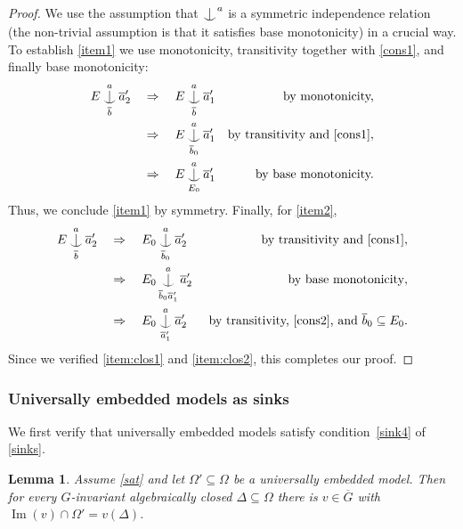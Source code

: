 \documentclass{article}
\newtheorem{lemma}[theorem]{Lemma}
\theoremstyle{remark}
\theoremstyle{definition}
\DeclareMathOperator{\im}{Im}
\def\Ind#1#2{#1\setbox0=\hbox{$#1x$}\kern\wd0\hbox to 0pt{\hss$#1\mid$\hss}
	\lower.9\ht0\hbox to 0pt{\hss$#1\smile$\hss}\kern\wd0}
\def\ind{\mathop{\mathpalette\Ind{}}}
\begin{document}
{{{{{\begin{proof}
    We use the assumption that $\ind^{a}$ is a symmetric independence relation (the non-trivial assumption is that it satisfies base monotonicity) in a crucial way. To establish \ref{item1} we use monotonicity, transitivity together with  \cref{cons1}, and finally base monotonicity:
    \begin{align*}
    E\ind^{a}_{\overline{b}}\overline{a}_2' \quad &\Rightarrow \quad E\ind^{a}_{\overline{b}}\overline{a}_1' &\text{ by monotonicity,}\\
&\Rightarrow\quad E\ind^{a}_{\overline{b}_{0}}\overline{a}_1' & \text{by transitivity and \eqref{cons1},}\\
&\Rightarrow \quad E\ind^{a}_{E_{0}}\overline{a}_1' & \text{ by base monotonicity.}
    \end{align*}
    Thus, we conclude \ref{item1} by symmetry. Finally, for \ref{item2}, 
    \begin{align*}
        E\ind^{a}_{\overline{b}}\overline{a}_2' \quad & \Rightarrow\quad E_{0}\ind^{a}_{\overline{b}_{{0}}}\overline{a}_2' &{\text{by transitivity and \eqref{cons1},}}\\
        &\Rightarrow\quad E_{0}\ind^{a}_{\overline{b}_0 \overline{a}_1'} \overline{a}_2' &\text{ by base monotonicity},\\
        &\Rightarrow\quad E_{0}\ind^{a}_{\overline{a}_1'}\overline{a}_2' &\text{ by transitivity,  \eqref{cons2}, and } \overline{b}_0\subseteq E_0.
    \end{align*}
    Since we verified \ref{item:clos1} and \ref{item:clos2}, this completes our proof.
  \end{proof}


 


    

\subsubsection{Universally embedded models as sinks}\label{subsub:sinks}


We first verify that universally embedded models satisfy condition~\ref{sink4} of \cref{sinks}.

\begin{lemma}\label{properties of universally embedded sets}
  	Assume \ref{sat} and let $\Omega'\subseteq\Omega$ be a universally embedded model. Then for every  $G$-invariant algebraically closed $\Delta\subseteq\Omega$  there is $v\in \overline{G}$ with $\im(v)\cap\Omega'=v(\Delta)$.
    

\end{lemma}}}}}}
\end{document}
